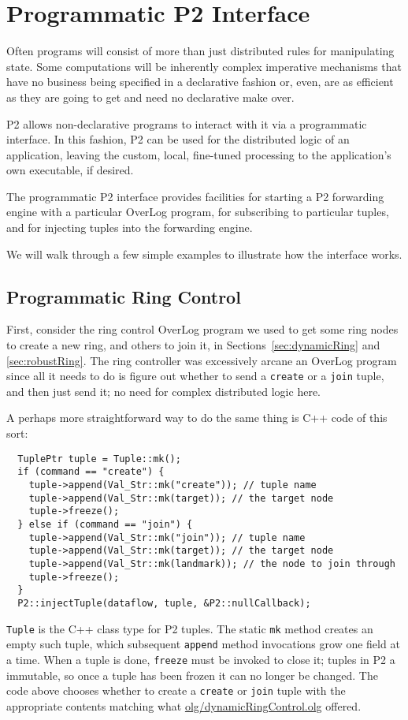 \documentclass{article}
\begin{document}
\section{Programmatic P2 Interface}
\label{sec:interface}

Often programs will consist of more than just distributed rules for
manipulating state. Some computations will be inherently complex
imperative mechanisms that have no business being specified in a
declarative fashion or, even, are as efficient as they are going to get
and need no declarative make over.

P2 allows  non-declarative programs to interact with it via a
programmatic interface.  In this fashion, P2 can be used for the
distributed logic of an application, leaving the custom, local,
fine-tuned processing to the application's own executable, if desired.

The programmatic P2 interface provides facilities for starting a P2
forwarding engine with a particular OverLog program, for subscribing to
particular tuples, and for injecting tuples into the forwarding engine.

We will walk through a few simple examples to illustrate how the
interface works.

\subsection{Programmatic Ring Control}
First, consider the ring control OverLog program we
used to get some ring nodes to create a new ring, and others to join it,
in Sections~\ref{sec:dynamicRing} and \ref{sec:robustRing}. The ring
controller was excessively arcane an OverLog program since all it needs
to do is figure out whether to send a \lstinline$create$ or a
\lstinline$join$ tuple, and then just send it; no need for complex
distributed logic here.

A perhaps more straightforward way to do the same thing is C++ code of
this sort:
\begin{verbatim}
  TuplePtr tuple = Tuple::mk();
  if (command == "create") {
    tuple->append(Val_Str::mk("create")); // tuple name
    tuple->append(Val_Str::mk(target)); // the target node
    tuple->freeze();
  } else if (command == "join") {
    tuple->append(Val_Str::mk("join")); // tuple name
    tuple->append(Val_Str::mk(target)); // the target node
    tuple->append(Val_Str::mk(landmark)); // the node to join through
    tuple->freeze();
  }
  P2::injectTuple(dataflow, tuple, &P2::nullCallback);
\end{verbatim}
\texttt{Tuple} is the C++ class type for P2 tuples. The static
\texttt{mk} method creates an empty such tuple, which subsequent
\texttt{append} method invocations grow one field at a time. When a tuple
is done, \texttt{freeze} must be invoked to close it; tuples in P2 a
immutable, so once a tuple has been frozen it can no longer be changed.
The code above chooses whether to create a \lstinline$create$ or
\lstinline$join$ tuple with the appropriate contents matching what
\url{olg/dynamicRingControl.olg} offered.
\end{document}
